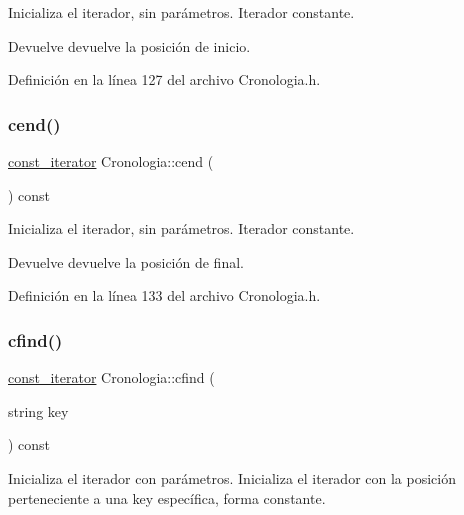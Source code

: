 Inicializa el iterador, sin parámetros. Iterador constante. 

\begin{DoxyReturn}{Devuelve}
devuelve la posición de inicio. 
\end{DoxyReturn}


Definición en la línea 127 del archivo Cronologia.\+h.

\hypertarget{classCronologia_afc9925e321be957f47312184af813d09}{}\label{classCronologia_afc9925e321be957f47312184af813d09} 
\subsubsection{\texorpdfstring{cend()}{cend()}}
{\footnotesize\ttfamily \hyperlink{classCronologia_1_1const__iterator}{const\+\_\+iterator} Cronologia\+::cend (\begin{DoxyParamCaption}{ }\end{DoxyParamCaption}) const\hspace{0.3cm}{\ttfamily [inline]}}



Inicializa el iterador, sin parámetros. Iterador constante. 

\begin{DoxyReturn}{Devuelve}
devuelve la posición de final. 
\end{DoxyReturn}


Definición en la línea 133 del archivo Cronologia.\+h.

\hypertarget{classCronologia_a24cb1afe568a8fccd6694485601d58c5}{}\label{classCronologia_a24cb1afe568a8fccd6694485601d58c5} 
\subsubsection{\texorpdfstring{cfind()}{cfind()}}
{\footnotesize\ttfamily \hyperlink{classCronologia_1_1const__iterator}{const\+\_\+iterator} Cronologia\+::cfind (\begin{DoxyParamCaption}\item[{string}]{key }\end{DoxyParamCaption}) const\hspace{0.3cm}{\ttfamily [inline]}}



Inicializa el iterador con parámetros. Inicializa el iterador con la posición perteneciente a una key específica, forma constante. 


